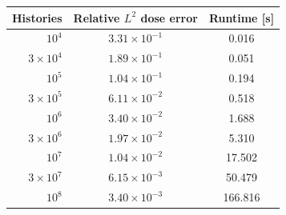 \begin{tabular}{rcc}
\toprule
Histories & Relative $L^2$ dose error & Runtime [s] \\
\midrule
$10^{4}$ & $3.31\times 10^{-1}$ & 0.016 \\
$3\times10^{4}$ & $1.89\times 10^{-1}$ & 0.051 \\
$10^{5}$ & $1.04\times 10^{-1}$ & 0.194 \\
$3\times10^{5}$ & $6.11\times 10^{-2}$ & 0.518 \\
$10^{6}$ & $3.40\times 10^{-2}$ & 1.688 \\
$3\times10^{6}$ & $1.97\times 10^{-2}$ & 5.310 \\
$10^{7}$ & $1.04\times 10^{-2}$ & 17.502 \\
$3\times10^{7}$ & $6.15\times 10^{-3}$ & 50.479 \\
$10^{8}$ & $3.40\times 10^{-3}$ & 166.816 \\
\bottomrule
\end{tabular}

